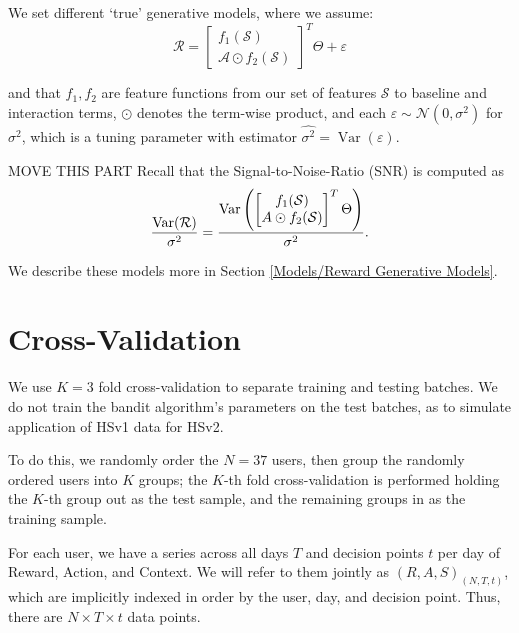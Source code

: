 We set different `true' generative models, where we assume:
\begin{equation}
\label{True Generative Model}
\mathcal{R} = \begin{bmatrix}f_1(\mathcal{S}) \\
\mathcal{A} \odot f_2(\mathcal{S})
\end{bmatrix}^T \Theta + \varepsilon
\end{equation}

and that $f_1, f_2$ are feature functions from our set of features $\mathcal{S}$ to baseline and interaction terms, $\odot$ denotes the term-wise product, and each $\varepsilon \sim \mathcal{N}\left(0, \sigma^2 \right)$ for $\sigma^2$, which is a tuning parameter with estimator $\hat{\sigma^2} = \operatorname{Var}(\varepsilon)$.  

MOVE THIS PART
Recall that the Signal-to-Noise-Ratio (SNR) is computed as 
\begin{equation}
\label{SNR equation}
	\frac{\mathrm{Var}(\mathcal{R})}{\sigma^2} = \frac{\mathrm{Var}\left(\begin{bmatrix}
f_1(\mathcal{S}) \\ A \odot f_2(\mathcal{S})	
\end{bmatrix}^T\Theta\right)}{\sigma^2}.
\end{equation}

We describe these models more in Section \ref{Models/Reward Generative Models}.





\section{Cross-Validation}

We use $K = 3$ fold cross-validation to separate training and testing batches.  We do not train the bandit algorithm's parameters on the test batches, as to simulate application of HSv1 data for HSv2.  

To do this, we randomly order the $N = 37$ users, then group the randomly ordered users into $K$ groups; the $K$-th fold cross-validation is performed holding the $K$-th group out as the test sample, and the remaining groups in as the training sample.

For each user, we have a series across all days $T$ and decision points $t$ per day of Reward, Action, and Context.  We will refer to them jointly as $(R, A, S)_{(N,T,t)}$, which are implicitly indexed in order by the user, day, and decision point.  Thus, there are $N \times T \times t$ data points.  




